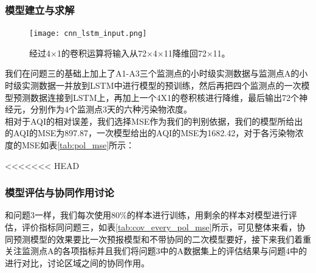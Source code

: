 \documentclass[bwprint]{gmcmthesis}
\numberwithin{figure}{section}
\begin{document}
\subsubsection{模型建立与求解}
\begin{figure}[!h]
	\centering
	\texttt{[image: cnn\_lstm\_input.png]}
	\caption{经过4×1的卷积运算将输入从72×4×11降维回72×11。}
	\label{CNN_LSTM-INPUT}
\end{figure}
我们在问题三的基础上加上了A1-A3三个监测点的小时级实测数据与监测点A的小时级实测数据一并放到LSTM中进行模型的预训练，然后再把四个监测点的一次模型预测数据连接到LSTM上，再加上一个4X1的卷积核进行降维，最后输出72个神经元，分别作为4个监测点3天的六种污染物浓度。\\
相对于AQI的相对误差，我们选择MSE作为我们的判别依据，我们的模型所给出的AQI的MSE为897.87，一次模型给出的AQI的MSE为1682.42，对于各污染物浓度的MSE如表\ref{tab:pol_mse}所示：
\begin{table}
	\caption{各污染物浓度MSE}\label{tab:pol_mse}
	\begin{center}
	\end{center}
\end{table}
<<<<<<< HEAD
\subsubsection{模型评估与协同作用讨论}
和问题3一样，我们每次使用80\%的样本进行训练，用剩余的样本对模型进行评估，评价指标同问题三，如表\ref{tab:cov_every_pol_mse}所示，可见整体来看，协同预测模型的效果要比一次预报模型和不带协同的二次模型要好，接下来我们着重关注监测点A的各项指标并且我们将问题3中的A数据集上的评估结果与问题4中的进行对比，讨论区域之间的协同作用。
\end{document}
